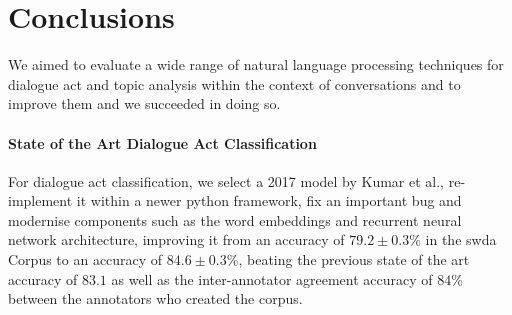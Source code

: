 \chapter{Conclusions}
We aimed to evaluate a wide range of natural language processing techniques for dialogue act and topic analysis within the context of conversations and to improve them and we succeeded in doing so.
\subsubsection{State of the Art Dialogue Act Classification}
    For dialogue act classification, we select a 2017 model by Kumar et al., re-implement it within a newer python framework, fix an important bug and modernise components such as the word embeddings and recurrent neural network architecture, improving it from an accuracy of $79.2 \pm 0.3\%$ in the \gls{swda} Corpus to an accuracy of $84.6 \pm 0.3\%$, beating the previous state of the art accuracy of $83.1$ as well as the inter-annotator agreement accuracy of $84\%$ between the annotators who created the corpus.

